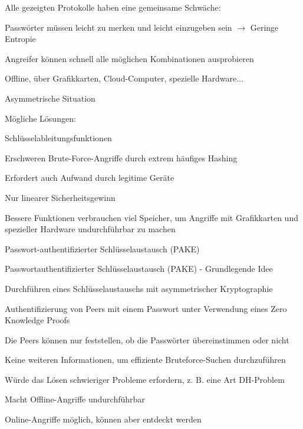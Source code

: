 \documentclass[a4paper]{article}
\begin{document}
\begin{multicols}{3}
      \begin{itemize*}
            \item Alle gezeigten Protokolle haben eine gemeinsame Schwäche:
            \begin{itemize*}
                  \item Passwörter müssen leicht zu merken und leicht einzugeben sein $\rightarrow$ Geringe Entropie
                  \item Angreifer können schnell alle möglichen Kombinationen ausprobieren
                  \item Offline, über Grafikkarten, Cloud-Computer, spezielle Hardware...
                  \item Asymmetrische Situation
            \end{itemize*}
            \item Mögliche Lösungen:
            \begin{itemize*}
                  \item Schlüsselableitungsfunktionen
                  \begin{itemize*} \item Erschweren Brute-Force-Angriffe durch extrem häufiges Hashing \item Erfordert auch Aufwand durch legitime Geräte \item Nur linearer Sicherheitsgewinn \item Bessere Funktionen verbrauchen viel Speicher, um Angriffe mit Grafikkarten und spezieller Hardware undurchführbar zu machen \end{itemize*}
                  \item Passwort-authentifizierter Schlüsselaustausch (PAKE)
            \end{itemize*}
            \item Passwortauthentifizierter Schlüsselaustausch (PAKE) - Grundlegende
            Idee
            \begin{itemize*}
                  \item Durchführen eines Schlüsselaustauschs mit asymmetrischer Kryptographie
                  \item Authentifizierung von Peers mit einem Passwort unter Verwendung eines Zero Knowledge Proofs
                  \item Die Peers können nur feststellen, ob die Passwörter übereinstimmen oder nicht
                  \item Keine weiteren Informationen, um effiziente Bruteforce-Suchen durchzuführen
                  \begin{itemize*} \item Würde das Lösen schwieriger Probleme erfordern, z. B. eine Art DH-Problem \item Macht Offline-Angriffe undurchführbar \end{itemize*}
                  \item Online-Angriffe möglich, können aber entdeckt werden
            \end{itemize*}
      \end{itemize*}



\end{multicols}
\end{document}
